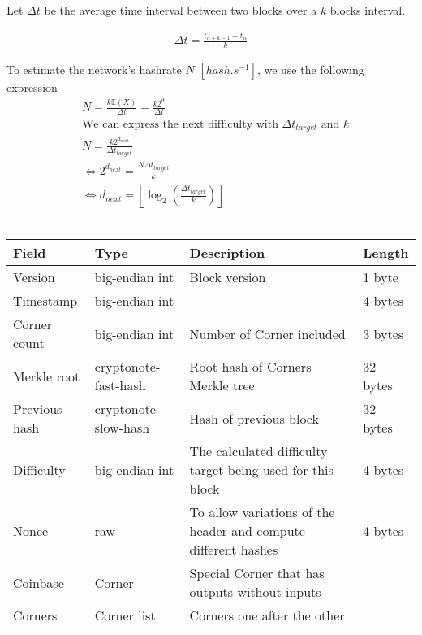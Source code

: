 \documentclass[a4paper,10pt]{article}
\begin{document}
            Let $\Delta t$ be the average time interval between two blocks over a $k$ blocks interval.
            
            \begin {align*}
             \Delta t = \frac{t_{n+k-1} - t_n}{k}
            \end {align*}

            
            To estimate the network's hashrate $N$ $[hash.s^{-1}]$, we use the following expression\\
            
            \begin {align*}
                &\text{}N = \frac{k\mathbb{E}(X)}{\Delta t} = \frac{k2^d}{\Delta t}\\
                &\text{We can express the next difficulty with ${\Delta t}_{target}$ and $k$}\\
                &N = \frac{k2^{d_{next}}}{{\Delta t}_{target}}\\
                &\Leftrightarrow 2^{d_{next}} = \frac{N{\Delta t}_{target}}{k}\\
                &\Leftrightarrow d_{next} = \left\lfloor\log_2\left(\frac{{\Delta t}_{target}}{k}\right)\right\rfloor
            \end {align*}\\
            \begin{tabularx}{\textwidth}{|l|l|X|l|}
            \hline Field & Type & Description & Length \\ \hline
            \hline Version & big-endian int & Block version & 1 byte \\
            \hline Timestamp & big-endian int & & 4 bytes\\
            \hline Corner count & big-endian int & Number of Corner included & 3 bytes\\
            \hline Merkle root & cryptonote-fast-hash & Root hash of Corners Merkle tree & 32 bytes\\
            \hline Previous hash & cryptonote-slow-hash & Hash of previous block & 32 bytes\\
            \hline Difficulty & big-endian int & The calculated difficulty target being used for this block & 4 bytes\\
            \hline Nonce & raw & To allow variations of the header and compute different hashes & 4 bytes \\
            \hline
            \hline Coinbase & Corner & Special Corner that has outputs without inputs & \\
            \hline Corners & Corner list & Corners one after the other & \\
            \hline
            \end{tabularx}
        
\end{document}
